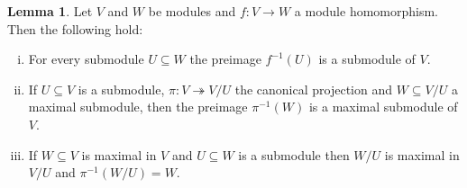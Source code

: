 \documentclass[a4paper,10pt]{article}
\theoremstyle{definition}
\newtheorem{lem}[own]{Lemma}
\begin{document}
\begin{lem}\label{lem:cool}
 Let $V$ and $W$ be modules and $f : V \rightarrow W$ a module homomorphism. Then the following hold:
 \begin{enumerate}[i)]
  \item For every submodule $U \subseteq W$ the preimage $f^{-1}(U)$ is a submodule of $V$. \label{lem:urbild}
  \item If $U \subseteq V$ is a submodule, $\pi : V \twoheadrightarrow V\!/U$ the canonical projection and $W \subseteq V\!/U$ a maximal submodule, then the preimage $\pi^{-1}(W)$ is a maximal submodule of $V$.\label{lem:urbildmax}
  \item If $W \subseteq V$ is maximal in $V$ and $U \subseteq W$ is a submodule then $W\!/U$ is maximal in $V\!/U$ and $\pi^{-1}(W\!/U) = W$. \label{lem:bildmax}
 \end{enumerate}
\end{lem}
\end{document}
